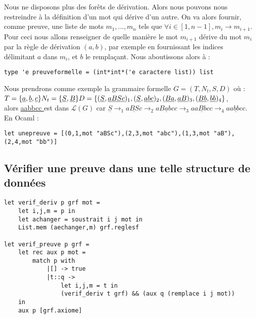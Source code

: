 \documentclass[a4paper,12pt]{article}
\begin{document}
Nous ne disposons plus des forêts de dérivation. Alors nous pouvons nous restreindre à la définition d'un mot qui dérive d'un autre.
On va alors fournir, comme preuve, une liste de mots $m_1, \dots, m_n$ tels que $\forall i\in [1,n-1], m_i \rightarrow m_{i+1}$. 
Pour ceci nous allons renseigner de quelle manière le mot $m_{i+1}$ dérive du mot $m_i$ par la règle de dérivation $(a,b)$, par exemple en fournissant les indices délimitant $a$ dans $m_i$, et $b$ le remplaçant.
Nous aboutissons alors à :
{\color{DarkBlue}\begin{verbatim}
type 'e preuveformelle = (int*int*('e caractere list)) list
\end{verbatim}}

Nous prendrons comme exemple la grammaire formelle $G = (T,N_t,S,D)$ où :\\
$
T = \{\underline{ a },\underline{ b },\underline{ c }\}\\
N_t = \{\underline{ S },\underline{ B }\}\\
D = \{(\underline{ S },\underline{ aBSc })_1,(\underline{ S },\underline{ abc })_2,(\underline{ Ba },\underline{ aB })_3,(\underline{ Bb },\underline{ bb })_4\}
$,\\
alors \underline{ aabbcc } est dans $\mathcal{L}(G)$ car $\underline{ S } \rightarrow_1 \underline{ aBSc } \rightarrow_2 \underline{ aBabcc } \rightarrow_3 \underline{ aaBbcc } \rightarrow_4 \underline{ aabbcc }$.\\
En Ocaml :
{\color{DarkBlue}\begin{verbatim}
let unepreuve = [(0,1,mot "aBSc"),(2,3,mot "abc"),(1,3,mot "aB"),(2,4,mot "bb")]
\end{verbatim}}

\subsection{Vérifier une preuve dans une telle structure de données}

{\color{DarkBlue}\begin{verbatim}
let verif_deriv p grf mot = 
    let i,j,m = p in
    let achanger = soustrait i j mot in
    List.mem (aechanger,m) grf.reglesf

let verif_preuve p grf = 
    let rec aux p mot = 
        match p with
            |[] -> true
            |t::q -> 
                let i,j,m = t in
                (verif_deriv t grf) && (aux q (remplace i j mot))
    in 
    aux p [grf.axiome]

\end{verbatim}}
\end{document}
